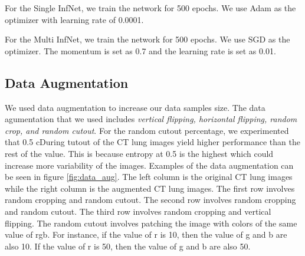 For the Single InfNet, we train the network for 500 epochs. We use Adam as the optimizer with learning rate of 0.0001. 

For the Multi InfNet, we train the network for 500 epochs. We use SGD as the optimizer. The momentum is set as 0.7 and the learning rate is set as 0.01.

\subsection{Data Augmentation}
We used data augmentation to increase our data samples size. The data agumentation that we used includes \textit{vertical flipping, horizontal flipping, random crop, and random cutout}. For the random cutout percentage, we experimented that 0.5 cDuring tutout of the CT lung images yield higher performance than the rest of the value. This is because entropy at 0.5 is the highest which could increase more variability of the images. Examples of the data augmentation can be seen in figure \ref{fig:data_aug}.
The left column is the original CT lung images while the right column is the augmented CT lung images. The first row involves random cropping and random cutout. The second row involves random cropping and random cutout. The third row involves random cropping and vertical flipping. The random cutout involves patching the image with colors of the same value of rgb. For instance, if the value of r is 10, then the value of g and b are also 10. If the value of r is 50, then the value of g and b are also 50.

